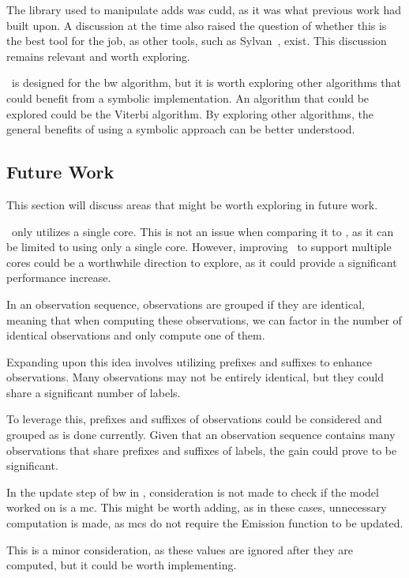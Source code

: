 The library used to manipulate \glspl{add} was \gls{cudd}, as it was what previous work had built upon.
A discussion at the time also raised the question of whether this is the best tool for the job, as other tools, such as Sylvan~\cite{van2017sylvan}, exist.
This discussion remains relevant and worth exploring.

\Cupaal\ is designed for the \gls{bw} algorithm, but it is worth exploring other algorithms that could benefit from a symbolic implementation.
An algorithm that could be explored could be the Viterbi algorithm.
By exploring other algorithms, the general benefits of using a symbolic approach can be better understood.


\subsection{Future Work}\label{subsec:future_work}
This section will discuss areas that might be worth exploring in future work.

\Cupaal\ only utilizes a single core. This is not an issue when comparing it to \Jajapy, as it can be limited to using only a single core.
However, improving \Cupaal\ to support multiple cores could be a worthwhile direction to explore, as it could provide a significant performance increase.

In an observation sequence, observations are grouped if they are identical, meaning that when computing these observations, we can factor in the number of identical observations and only compute one of them.

Expanding upon this idea involves utilizing prefixes and suffixes to enhance observations.
Many observations may not be entirely identical, but they could share a significant number of labels.

To leverage this, prefixes and suffixes of observations could be considered and grouped as is done currently.
Given that an observation sequence contains many observations that share prefixes and suffixes of labels, the gain could prove to be significant.

In the update step of \gls{bw} in \Cupaal, consideration is not made to check if the model worked on is a \gls{mc}.
This might be worth adding, as in these cases, unnecessary computation is made, as \glspl{mc} do not require the Emission function to be updated.

This is a minor consideration, as these values are ignored after they are computed, but it could be worth implementing.
